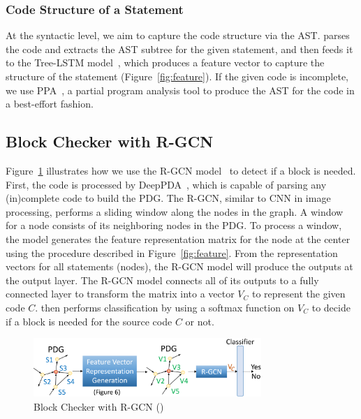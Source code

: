 \vspace{-1pt}
\subsubsection{Code Structure of a Statement}

At the syntactic level, we aim to capture the code structure via the
AST. {\tool} parses the code and extracts the AST subtree for the
given statement, and then feeds it to the Tree-LSTM
model~\cite{tai2015improved}, which produces a feature vector to
capture the structure of the statement (Figure~\ref{fig:feature}). If
the given code is incomplete, we use PPA~\cite{dagenais-oopsla08}, a
partial program analysis tool to produce the AST for the code in a
best-effort fashion.


\subsection{ Block Checker with R-GCN}
\label{model:sec}



Figure~\ref{fig:gcn} illustrates how we use the R-GCN model~\cite{rgcn} to
detect if a  block is needed.
First, the code is processed by DeepPDA~\cite{icse23}, which is
capable of parsing any (in)complete code to build the PDG. The
R-GCN, similar to CNN in image processing, performs a sliding
window along the nodes in the graph. A window for a node consists of
its neighboring nodes in the PDG.
To process a window, the model generates the feature representation
matrix for the node at the center using the procedure described in
Figure~\ref{fig:feature}.
From the representation vectors for all statements (nodes), the R-GCN
model will produce the outputs at the output layer. The R-GCN model
connects all of its outputs to a fully connected layer to transform
the matrix into a vector $V_C$ to represent the given code
$C$. {\tool} then performs classification by using a softmax function
on $V_C$ to decide if a  block is needed for the
source code $C$ or not.

\begin{figure}[t]
	\centering
	\includegraphics[width=3.4in]{xblock.png}
	\caption{ Block Checker with R-GCN ({\xblock})}
	\label{fig:gcn}	
\end{figure}

